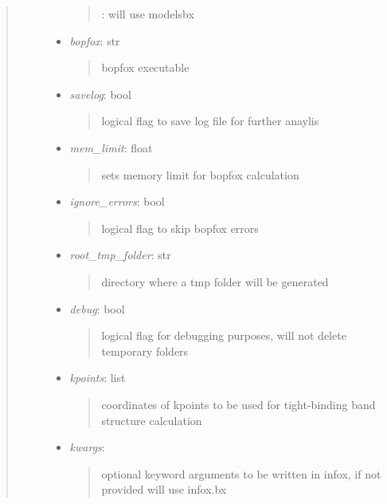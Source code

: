 \documentclass[letterpaper,10pt,english]{sphinxmanual}
\begin{document}
\begin{fulllineitems}
\begin{quote}
\begin{description}
\begin{itemize}
\begin{quote}
: will use modelsbx
\end{quote}

\item {} 
\emph{bopfox}: str
\begin{quote}

bopfox executable
\end{quote}

\item {} 
\emph{savelog}: bool
\begin{quote}

logical flag to save log file for further anaylis
\end{quote}

\item {} 
\emph{mem\_limit}: float
\begin{quote}

sets memory limit for bopfox calculation
\end{quote}

\item {} 
\emph{ignore\_errors}: bool
\begin{quote}

logical flag to skip bopfox errors
\end{quote}

\item {} 
\emph{root\_tmp\_folder}: str
\begin{quote}

directory where a tmp folder will be generated
\end{quote}

\item {} 
\emph{debug}: bool
\begin{quote}

logical flag for debugging purposes, will not delete temporary
folders
\end{quote}

\item {} 
\emph{kpoints}: list
\begin{quote}

coordinates of kpoints to be used for tight-binding band structure
calculation
\end{quote}

\item {} 
\emph{kwargs}:
\begin{quote}

optional keyword arguments to be written in infox, if not provided
will use infox.bx
\end{quote}


\end{itemize}
\end{description}
\end{quote}
\end{fulllineitems}
\end{document}
